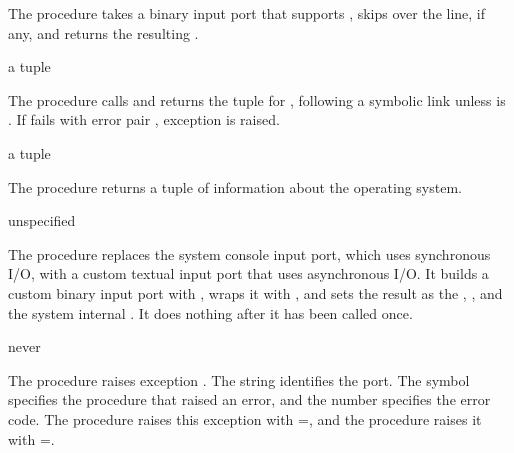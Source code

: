 The  procedure takes a binary input port
 that supports , skips over the
 line, if any, and returns the
resulting .

\begin{procedure}
\end{procedure}
\returns{} a  tuple

The  procedure calls  and returns
the  tuple for , following a symbolic link
unless  is . If  fails
with error pair , exception
 is raised.

\begin{procedure}
\end{procedure}
\returns{} a  tuple

The  procedure returns a \hyperref[uname-tuple]{}
tuple of information about the operating system.

\begin{procedure}
\end{procedure}
\returns{} unspecified

The  procedure replaces the system console
input port, which uses synchronous I/O, with a custom textual input
port that uses asynchronous I/O. It builds a custom binary input port
with , wraps it with , and
sets the result as the ,
, and the system internal
. It does nothing after it has been called
once.

\begin{procedure}
\end{procedure}
\returns{} never

The  procedure raises exception .  The string 
identifies the port.  The symbol  specifies the procedure
that raised an error, and the number  specifies the error
code.  The  procedure raises this exception with
=, and the 
procedure raises it with =.

